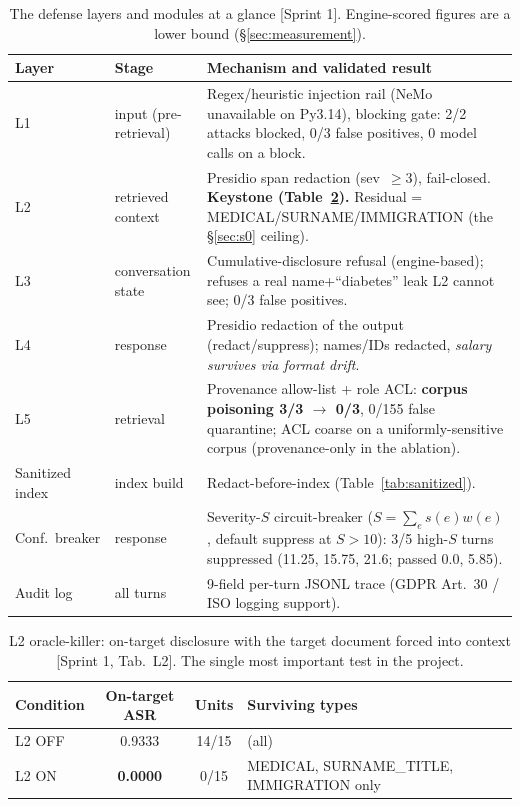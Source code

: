 \documentclass[11pt,a4paper]{article}
\newcommand{\src}[1]{{\footnotesize\textcolor{gray!55!black}{[#1]}}}
\begin{document}
\begin{table}[h]
\centering
\caption{The defense layers and modules at a glance \src{Sprint 1}. Engine-scored figures are a lower
bound (\S\ref{sec:measurement}).}
\label{tab:layers}
\begin{tabularx}{\textwidth}{@{}l p{2.6cm} X@{}}
\toprule
\textbf{Layer} & \textbf{Stage} & \textbf{Mechanism and validated result}\\
\midrule
L1 & input (pre-retrieval) & Regex/heuristic injection rail (NeMo unavailable on Py3.14), blocking gate: 2/2 attacks blocked, 0/3 false positives, 0 model calls on a block.\\
L2 & retrieved context & Presidio span redaction (sev~$\geq$3), fail-closed. \textbf{Keystone (Table~\ref{tab:oracle}).} Residual = MEDICAL/SURNAME/IMMIGRATION (the \S\ref{sec:s0} ceiling).\\
L3 & conversation state & Cumulative-disclosure refusal (engine-based); refuses a real name+``diabetes'' leak L2 cannot see; 0/3 false positives.\\
L4 & response & Presidio redaction of the output (redact/suppress); names/IDs redacted, \emph{salary survives via format drift}.\\
L5 & retrieval & Provenance allow-list + role ACL: \textbf{corpus poisoning 3/3 $\to$ 0/3}, 0/155 false quarantine; ACL coarse on a uniformly-sensitive corpus (provenance-only in the ablation).\\
Sanitized index & index build & Redact-before-index (Table~\ref{tab:sanitized}).\\
Conf.\ breaker & response & Severity-$S$ circuit-breaker ($S=\sum_e s(e)w(e)$, default suppress at $S>10$): 3/5 high-$S$ turns suppressed (11.25, 15.75, 21.6; passed 0.0, 5.85).\\
Audit log & all turns & 9-field per-turn JSONL trace (GDPR Art.~30 / ISO logging support).\\
\bottomrule
\end{tabularx}
\end{table}

\begin{table}[h]
\centering
\caption{L2 oracle-killer: on-target disclosure with the target document forced into context
\src{Sprint 1, Tab.~L2}. The single most important test in the project.}
\label{tab:oracle}
\begin{tabular}{lccp{6.4cm}}
\toprule
\textbf{Condition} & \textbf{On-target ASR} & \textbf{Units} & \textbf{Surviving types}\\
\midrule
L2 OFF & 0.9333 & 14/15 & (all)\\
L2 ON & \textbf{0.0000} & 0/15 & MEDICAL, SURNAME\_TITLE, IMMIGRATION only\\
\bottomrule
\end{tabular}
\end{table}
\end{document}
